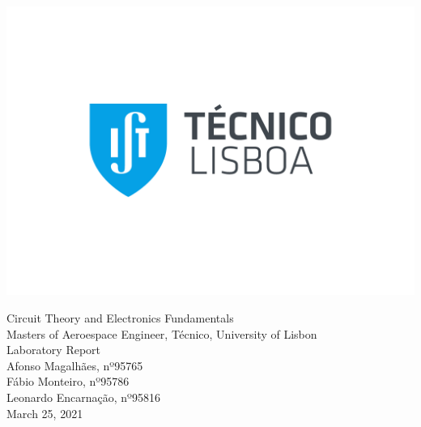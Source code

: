 
\thispagestyle {empty}

\includegraphics[bb=9.5cm 11cm 0cm 0cm,scale=0.29]{IST_A_CMYK_POS}

\begin{center}
%
\vspace{1.0cm}
\vspace{1cm}
{\FontLb Circuit Theory and Electronics Fundamentals} \\
\vspace{1cm}
{\FontSn Masters of Aeroespace Engineer, Técnico, University of Lisbon} \\ 
\vspace{1cm}
{\FontSn Laboratory Report} \\
\vspace{1cm}
{\FontSn Afonso Magalhães, nº95765}\\ 
{\FontSn Fábio Monteiro, nº95786}\\
{\FontSn Leonardo Encarnação, nº95816}\\
\vspace{3cm}
{\FontSn March 25, 2021}  
\end{center}

\newpage

